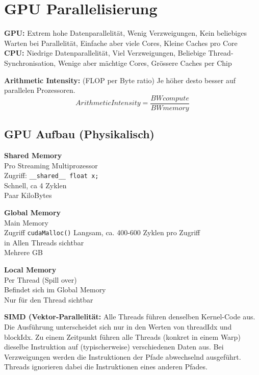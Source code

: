 \section{GPU Parallelisierung}
\textbf{GPU:} Extrem hohe Datenparallelität, Wenig Verzweigungen, Kein beliebiges Warten bei Parallelität, Einfache aber viele Cores, Kleine Caches pro Core \\
\textbf{CPU:} Niedrige Datenparallelität, Viel Verzweigungen, Beliebige Thread-Synchronisation, Wenige aber mächtige Cores, Grössere Caches per Chip

\textbf{Arithmetic Intensity:} (FLOP per Byte ratio) Je höher desto besser auf parallelen Prozessoren. 
\[ ArithmeticIntensity = \frac{BWcompute}{BWmemory} \]

\subsection{GPU Aufbau (Physikalisch)}
\begin{minipage}[t]{0.33\linewidth}
	\textbf{Shared Memory} \\
	Pro Streaming Multiprozessor \\
	Zugriff: \lstinline|__shared__ float x;| \\
	Schnell, ca 4 Zyklen \\
	Paar KiloBytes
\end{minipage}
\begin{minipage}[t]{0.33\linewidth}
	\textbf{Global Memory}\\
	Main Memory \\
	Zugriff \lstinline|cudaMalloc()|
	Langsam, ca. 400-600 Zyklen pro Zugriff \\
	in Allen Threads sichtbar \\
	Mehrere GB
\end{minipage}
\begin{minipage}[t]{0.33\linewidth}
	\textbf{Local Memory} \\
	Per Thread (Spill over) \\
	Befindet sich im Global Memory \\
	Nur für den Thread sichtbar
\end{minipage}

\textbf{SIMD (Vektor-Parallelität:} Alle Threads führen denselben Kernel-Code aus. Die Ausführung unterscheidet sich nur in den Werten von threadIdx und blockIdx. Zu einem Zeitpunkt führen alle Threads (konkret in einem Warp) dieselbe Instruktion auf (typischerweise) verschiedenen Daten aus. Bei Verzweigungen werden die Instruktionen der Pfade abwechselnd ausgeführt. Threads ignorieren dabei die Instruktionen eines anderen Pfades.

